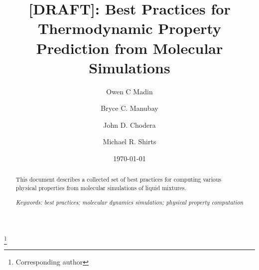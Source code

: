 \documentclass[aps,pre,twocolumn,nofootinbib,superscriptaddress,linenumbers,10pt, draft,tightenlines]{revtex4-1}
\begin{document}


\title{[DRAFT]: Best Practices for Thermodynamic Property Prediction from Molecular Simulations}

\author{Owen C Madin}

\author{Bryce C. Manubay} 

\author{John D. Chodera}

\author{Michael R. Shirts}
\thanks{Corresponding author}

\date{\today}


\begin{abstract}
This document describes a collected set of best practices for computing various physical properties from molecular simulations of liquid mixtures.

\emph{Keywords: best practices; molecular dynamics simulation; physical property computation}


\end{abstract}
\maketitle

\listoftodos

\end{document}
